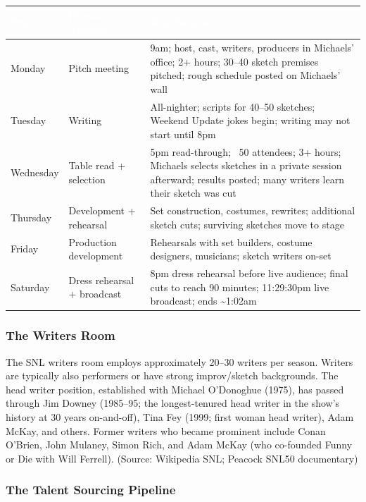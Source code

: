 \documentclass[11pt,letterpaper]{article}
\newcommand{\tableheader}[1]{\textbf{\sffamily\textcolor{white}{#1}}}
\begin{document}
\begin{center}
\begin{tabularx}{\textwidth}{L{1.8cm}L{3.5cm}X}
\toprule
{}
\tableheader{Day} & \tableheader{Primary Activity} & \tableheader{Key Details} \\
\midrule
Monday & Pitch meeting & 9am; host, cast, writers, producers in Michaels' office; 2+ hours; 30--40 sketch premises pitched; rough schedule posted on Michaels' wall \\
Tuesday & Writing & All-nighter; scripts for 40--50 sketches; Weekend Update jokes begin; writing may not start until 8pm \\
Wednesday & Table read + selection & 5pm read-through; ~50 attendees; 3+ hours; Michaels selects sketches in a private session afterward; results posted; many writers learn their sketch was cut \\
Thursday & Development + rehearsal & Set construction, costumes, rewrites; additional sketch cuts; surviving sketches move to stage \\
Friday & Production development & Rehearsals with set builders, costume designers, musicians; sketch writers on-set \\
Saturday & Dress rehearsal + broadcast & 8pm dress rehearsal before live audience; final cuts to reach 90 minutes; 11:29:30pm live broadcast; ends \textasciitilde{}1:02am \\
\bottomrule
\end{tabularx}
\end{center}

\subsubsection{The Writers Room}

The SNL writers room employs approximately 20--30 writers per season. Writers are typically also performers or have strong improv/sketch backgrounds. The head writer position, established with Michael O'Donoghue (1975), has passed through Jim Downey (1985--95; the longest-tenured head writer in the show's history at 30 years on-and-off), Tina Fey (1999; first woman head writer), Adam McKay, and others. Former writers who became prominent include Conan O'Brien, John Mulaney, Simon Rich, and Adam McKay (who co-founded Funny or Die with Will Ferrell). (Source: Wikipedia SNL; Peacock SNL50 documentary)

\subsubsection{The Talent Sourcing Pipeline}
\end{document}
